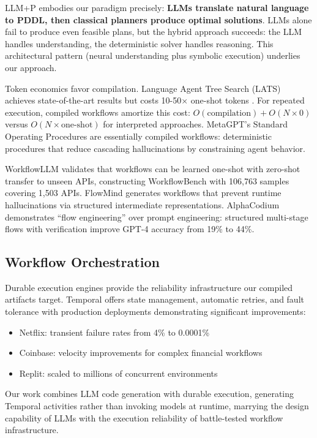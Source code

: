 \documentclass[11pt]{article}
\begin{document}
LLM+P \citep{liu2023llmp} embodies our paradigm precisely: \textbf{LLMs translate natural language to PDDL, then classical planners produce optimal solutions}. LLMs alone fail to produce even feasible plans, but the hybrid approach succeeds: the LLM handles understanding, the deterministic solver handles reasoning. This architectural pattern (neural understanding plus symbolic execution) underlies our approach.

Token economics favor compilation. Language Agent Tree Search (LATS) achieves state-of-the-art results but costs 10-50$\times$ one-shot tokens \citep{zhou2024lats}. For repeated execution, compiled workflows amortize this cost: $O(\text{compilation}) + O(N \times 0)$ versus $O(N \times \text{one-shot})$ for interpreted approaches. MetaGPT's Standard Operating Procedures \citep{hong2024metagpt} are essentially compiled workflows: deterministic procedures that reduce cascading hallucinations by constraining agent behavior.

WorkflowLLM \citep{fan2024workflowllm} validates that workflows can be learned one-shot with zero-shot transfer to unseen APIs, constructing WorkflowBench with 106,763 samples covering 1,503 APIs. FlowMind \citep{zeng2024flowmind} generates workflows that prevent runtime hallucinations via structured intermediate representations. AlphaCodium \citep{ridnik2024alphacodium} demonstrates ``flow engineering'' over prompt engineering: structured multi-stage flows with verification improve GPT-4 accuracy from 19\% to 44\%.

\subsection{Workflow Orchestration}

Durable execution engines provide the reliability infrastructure our compiled artifacts target. Temporal \citep{temporal2024} offers state management, automatic retries, and fault tolerance with production deployments demonstrating significant improvements:
\begin{itemize}
    \item Netflix: transient failure rates from 4\% to 0.0001\%
    \item Coinbase: velocity improvements for complex financial workflows
    \item Replit: scaled to millions of concurrent environments
\end{itemize}

Our work combines LLM code generation with durable execution, generating Temporal activities rather than invoking models at runtime, marrying the design capability of LLMs with the execution reliability of battle-tested workflow infrastructure.
\end{document}

